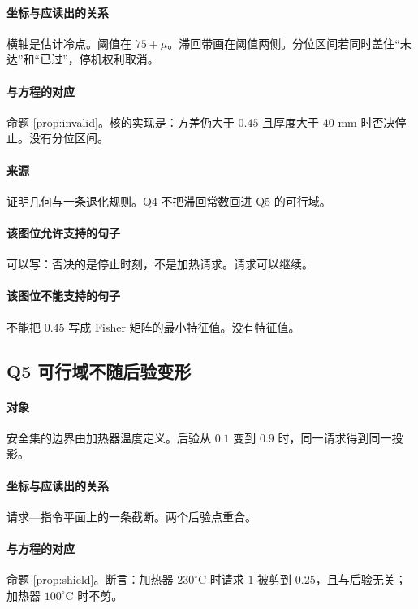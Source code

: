 \paragraph{坐标与应读出的关系}
横轴是估计冷点。阈值在 $75+\mu$。滞回带画在阈值两侧。分位区间若同时盖住“未达”和“已过”，停机权利取消。

\paragraph{与方程的对应}
命题 \ref{prop:invalid}。核的实现是：方差仍大于 $0.45$ 且厚度大于 $40$ mm 时否决停止。没有分位区间。

\paragraph{来源}
证明几何与一条退化规则。Q4 不把滞回常数画进 Q5 的可行域。

\paragraph{该图位允许支持的句子}
可以写：否决的是停止时刻，不是加热请求。请求可以继续。

\paragraph{该图位不能支持的句子}
不能把 $0.45$ 写成 Fisher 矩阵的最小特征值。没有特征值。

\subsection{Q5 可行域不随后验变形}
\paragraph{对象}
安全集的边界由加热器温度定义。后验从 $0.1$ 变到 $0.9$ 时，同一请求得到同一投影。

\paragraph{坐标与应读出的关系}
请求—指令平面上的一条截断。两个后验点重合。

\paragraph{与方程的对应}
命题 \ref{prop:shield}。断言：加热器 $230^\circ\mathrm{C}$ 时请求 $1$ 被剪到 $0.25$，且与后验无关；加热器 $100^\circ\mathrm{C}$ 时不剪。


